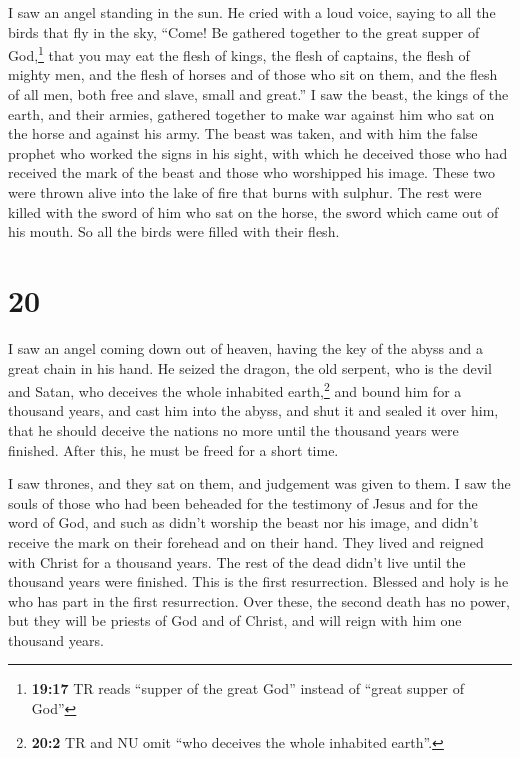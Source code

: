  I saw an angel standing in the sun. He cried with a loud
voice, saying to all the birds that fly in the sky, ``Come! Be gathered
together to the great supper of God,\footnote{\textbf{19:17} TR reads
  ``supper of the great God'' instead of ``great supper of God''}
 that you may eat the flesh of kings, the flesh of
captains, the flesh of mighty men, and the flesh of horses and of those
who sit on them, and the flesh of all men, both free and slave, small
and great.''  I saw the beast, the kings of the earth,
and their armies, gathered together to make war against him who sat on
the horse and against his army.  The beast was taken, and
with him the false prophet who worked the signs in his sight, with which
he deceived those who had received the mark of the beast and those who
worshipped his image. These two were thrown alive into the lake of fire
that burns with sulphur.  The rest were killed with the
sword of him who sat on the horse, the sword which came out of his
mouth. So all the birds were filled with their flesh.

\hypertarget{section-19}{%
\section{20}\label{section-19}}

 I saw an angel coming down out of heaven, having the key
of the abyss and a great chain in his hand.  He seized the
dragon, the old serpent, who is the devil and Satan, who deceives the
whole inhabited earth,\footnote{\textbf{20:2} TR and NU omit ``who
  deceives the whole inhabited earth''.} and bound him for a thousand
years,  and cast him into the abyss, and shut it and
sealed it over him, that he should deceive the nations no more until the
thousand years were finished. After this, he must be freed for a short
time.

 I saw thrones, and they sat on them, and judgement was
given to them. I saw the souls of those who had been beheaded for the
testimony of Jesus and for the word of God, and such as didn't worship
the beast nor his image, and didn't receive the mark on their forehead
and on their hand. They lived and reigned with Christ for a thousand
years.  The rest of the dead didn't live until the
thousand years were finished. This is the first resurrection.
 Blessed and holy is he who has part in the first
resurrection. Over these, the second death has no power, but they will
be priests of God and of Christ, and will reign with him one thousand
years.

